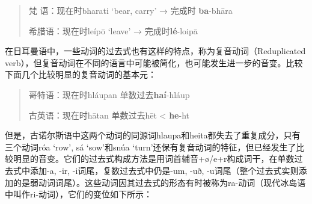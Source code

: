 \begin{quote}
梵 语：现在时bharati `bear, carry' → 完成时 \textbf{ba}-bhāra

希腊语：现在时leípō `leave' → 完成时\textbf{lé}-loipā
\end{quote}

在日耳曼语中，一些动词的过去式也有这样的特点，称为复音动词（Reduplicated
verb），但复音动词在不同的语言中可能被简化，也可能发生进一步的音变。比较下面几个比较明显的复音动词的基本元：

\begin{quote}
哥特语：现在时hláupan 单数过去\textbf{haí}-hláup

古英语：现在时hātan 单数过去hēt \textless{} \textbf{he}-ht
\end{quote}

但是，古诺尔斯语中这两个动词的同源词hlaupa和heita都失去了重复成分，只有三个动词róa
`row‌', sá `sow‌'和snúa
`turn‌'还保有复音动词的特征，但已经发生了比较明显的音变。它们的过去式构成方法是用词首辅音+ø/e+r构成词干，在单数过去式中添加-a,
-ir, -i词尾，复数过去式中仍是-um, -uð,
-u词尾（整个过去式实则添加的是弱动词词尾）。这些动词因其过去式的形态有时被称为ra-动词（现代冰岛语中叫作ri-动词），它们的变位如下所示：

